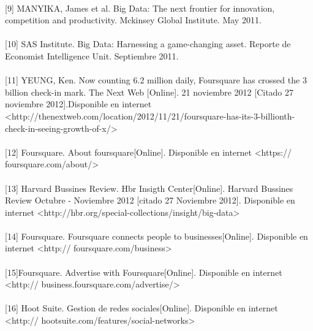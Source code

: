 \paragraph{}
[9]  MANYIKA, James et al.  Big Data: The next frontier for innovation, competition and productivity. Mckinsey Global Institute. May 2011.
\paragraph{}
[10] SAS Institute.  Big Data: Harnessing a game-changing asset. Reporte de Economist Intelligence Unit. Septiembre 2011.
\paragraph{}
[11] YEUNG, Ken. Now counting 6.2 million daily, Foursquare has crossed the 3 billion check-in mark. The Next Web [Online]. 21 noviembre 2012 [Citado 27 noviembre 2012].Disponible en internet \textless http://thenextweb.com/location/2012/11/21/foursquare-has-its-3-billionth-check-in-seeing-growth-of-x/\textgreater
\paragraph{}
[12] Foursquare. About foursquare[Online]. Disponible en internet 
\textless https:// foursquare.com/about/\textgreater
\paragraph{}
[13] Harvard Bussines Review. Hbr Insigth Center[Online]. Harvard Bussines Review Octubre - Noviembre 2012 [citado 27 Noviembre 2012]. Disponible en internet 
\textless http://hbr.org/special-collections/insight/big-data\textgreater
\paragraph{}
[14] Foursquare. Foursquare connects people to businesses[Online]. Disponible en internet 
\textless http:// foursquare.com/business\textgreater
\paragraph{}
[15]Foursquare. Advertise with Foursquare[Online]. Disponible en internet 
\textless http:// business.foursquare.com/advertise/\textgreater
\paragraph{}
[16] Hoot Suite. Gestion de redes sociales[Online]. Disponible en internet 
\textless http:// hootsuite.com/features/social-networks\textgreater
